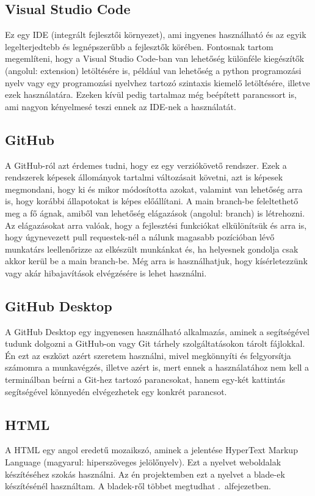 \documentclass[]{thesis-ekf}
\theoremstyle{definition}
\theoremstyle{remark}
\begin{document}
	\subsection{Visual Studio Code}
		Ez egy IDE (integrált fejlesztői környezet), ami ingyenes használható és az egyik legelterjedtebb és legnépszerűbb a fejlesztők körében. Fontosnak tartom megemlíteni, hogy a Visual Studio Code-ban van lehetőség különféle kiegészítők (angolul: extension) letöltésére is, például van lehetőség a python programozási nyelv vagy egy programozási nyelvhez tartozó szintaxis kiemelő letöltésére, illetve ezek használatára. Ezeken kívül pedig tartalmaz még beépített parancssort is, ami nagyon kényelmesé teszi ennek az IDE-nek a használatát. 
	\subsection{GitHub}
		A GitHub-ról azt érdemes tudni, hogy ez egy verziókövető rendszer. Ezek a rendszerek képesek állományok tartalmi változásait követni, azt is képesek megmondani, hogy ki és mikor módosította azokat, valamint van lehetőség arra is, hogy korábbi állapotokat is képes előállítani. A main branch-be feleltethető meg a fő ágnak, amiből van lehetőség elágazások (angolul: branch) is létrehozni. Az elágazásokat arra valóak, hogy a fejlesztési funkciókat elkülönítsük és arra is, hogy úgynevezett pull requestek-nél a nálunk magasabb pozícióban lévő munkatárs leellenőrizze az elkészült munkánkat és, ha helyesnek gondolja csak akkor kerül be a main branch-be. Még arra is használhatjuk, hogy kísérletezzünk vagy akár hibajavítások elvégzésére is lehet használni.
	\subsection{GitHub Desktop}
		A GitHub Desktop egy ingyenesen használható alkalmazás, aminek a segítségével tudunk dolgozni a GitHub-on vagy Git tárhely szolgáltatásokon tárolt fájlokkal. Én ezt az eszközt azért szeretem használni, mivel megkönnyíti és felgyorsítja számomra a munkavégzés, illetve azért is, mert ennek a használatához nem kell a terminálban beírni a Git-hez tartozó parancsokat, hanem egy-két kattintás segítségével könnyedén elvégezhetek egy konkrét parancsot. \cite{GitHubDesktop}
	\subsection{HTML}
		A HTML egy angol eredetű mozaikszó, aminek a jelentése HyperText Markup Language (magyarul: hiperszöveges jelölőnyelv). Ezt a nyelvet weboldalak készítéséhez szokás használni. Az én projektemben ezt a nyelvet a blade-ek készítésénél használtam. A bladek-ről többet megtudhat .~alfejezetben.   
\end{document}

